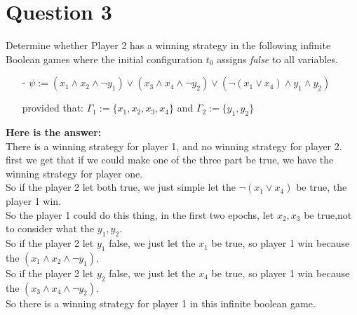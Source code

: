 \documentclass{article}
\begin{document}
    \section{Question 3}
    Determine whether Player \textsf{2} has a winning strategy in the following infinite Boolean games where the initial configuration $t_{0}$ assigns \emph{false} to all variables.
    \begin{itemize}
        \item[-] $\psi :=(x_{1}\wedge x_{2}\wedge\neg y_{1})\vee(x_{3}\wedge x_{4}\wedge\neg y_{2})\vee(\neg(x_{1}\vee x_{4})\wedge y_{1}\wedge y_{2})$
        \item[] provided that: $\Gamma_{1}:=\{x_{1}, x_{2}, x_{3}, x_{4}\}$ and $\Gamma_{2}:=\{y_{1}, y_{2}\}$
    \end{itemize}
    \textbf{Here is the answer:}\\
    There is a winning strategy for player 1, and no winning strategy for player 2.\\
    first we get that if we could make one of the three part be true, we have the winning strategy for player one.\\
    So if the player 2 let both true, we just simple let the $\neg(x_{1}\vee x_{4})$ be true, the player 1 win.\\
    So the player 1 could do this thing, in the first two epochs, let $x_2, x_3$ be true,not to consider what the $y_1, y_2$.\\
    So if the player 2 let $y_1$ false, we just let the $x_1$ be true, so player 1 win because the $(x_{1}\wedge x_{2}\wedge\neg y_{1})$.\\
    So if the player 2 let $y_2$ false, we just let the $x_4$ be true, so player 1 win because the $(x_{3}\wedge x_{4}\wedge\neg y_{2})$.\\
    So there is a winning strategy for player 1 in this infinite boolean game.\\
\end{document}
